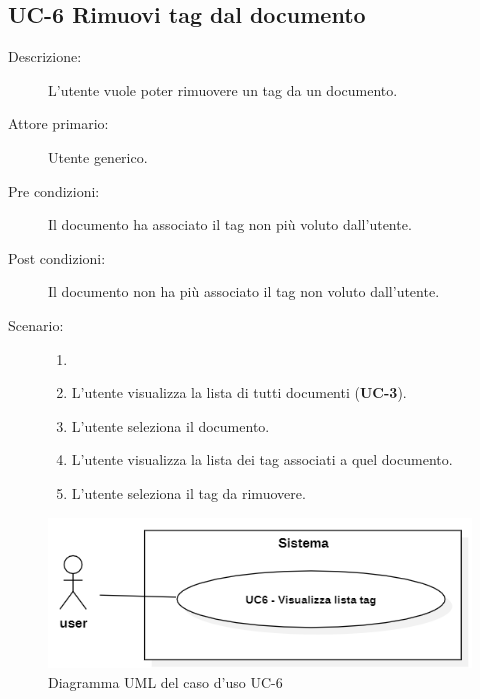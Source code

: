 \subsection{UC-6 Rimuovi tag dal documento}
\begin{description}
    \item[Descrizione:] L’utente vuole poter rimuovere un tag da un documento.
    \item[Attore primario:] Utente generico.
    \item[Pre condizioni:] Il documento ha associato il tag non più voluto dall’utente.
    \item[Post condizioni:] Il documento non ha più associato il tag non voluto dall’utente.
    \item[Scenario:]
    \begin{enumerate}
        \item[]
        \item L’utente visualizza la lista di tutti documenti (\textbf{UC-3}).
        \item L'utente seleziona il documento.
        \item L’utente visualizza la lista dei tag associati a quel documento.
        \item L’utente seleziona il tag da rimuovere.
    \end{enumerate}
\end{description}

\begin{figure}[H]
    \centering
    \includegraphics[width=0.8\linewidth]{UC6.png} %
    \caption{Diagramma UML del caso d'uso UC-6}
    \label{fig:UC6}
\end{figure}

